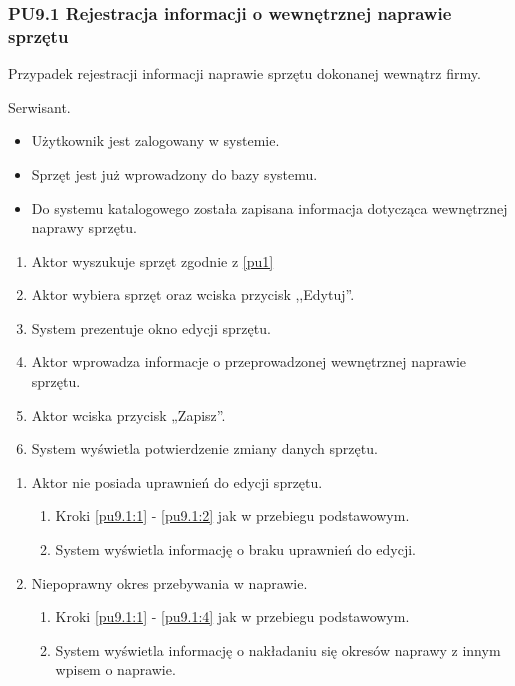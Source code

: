 \subsubsection{PU9.1 Rejestracja informacji o wewnętrznej naprawie sprzętu}
Przypadek rejestracji informacji naprawie sprzętu dokonanej wewnątrz firmy.

Serwisant.

\begin{itemize}
\item Użytkownik jest zalogowany w systemie.
\item Sprzęt jest już wprowadzony do bazy systemu.
\end{itemize}

\begin{itemize}
\item Do systemu katalogowego została zapisana informacja dotycząca wewnętrznej naprawy sprzętu.
\end{itemize}

\begin{enumerate}
	\item \label{pu9.1:1} Aktor wyszukuje sprzęt zgodnie z \ref{pu1}
	\item \label{pu9.1:2} Aktor wybiera sprzęt oraz wciska przycisk ,,Edytuj''.
	\item System prezentuje okno edycji sprzętu.
	\item \label{pu9.1:4} Aktor wprowadza informacje o przeprowadzonej wewnętrznej naprawie sprzętu.
	\item Aktor wciska przycisk „Zapisz”.
	\item System wyświetla potwierdzenie zmiany danych sprzętu.
\end{enumerate}

\begin{enumerate}
	\item Aktor nie posiada uprawnień do edycji sprzętu.
	\begin{enumerate}[label*=\arabic*.]
		\item Kroki \ref{pu9.1:1} - \ref{pu9.1:2} jak w przebiegu podstawowym.
		\item System wyświetla informację o braku uprawnień do edycji.
	\end{enumerate}
	\item Niepoprawny okres przebywania w naprawie.
	\begin{enumerate}[label*=\arabic*.]
		\item Kroki \ref{pu9.1:1} - \ref{pu9.1:4} jak w przebiegu podstawowym.
		\item System wyświetla informację o nakładaniu się okresów naprawy z innym wpisem o naprawie.
	\end{enumerate}
\end{enumerate}

